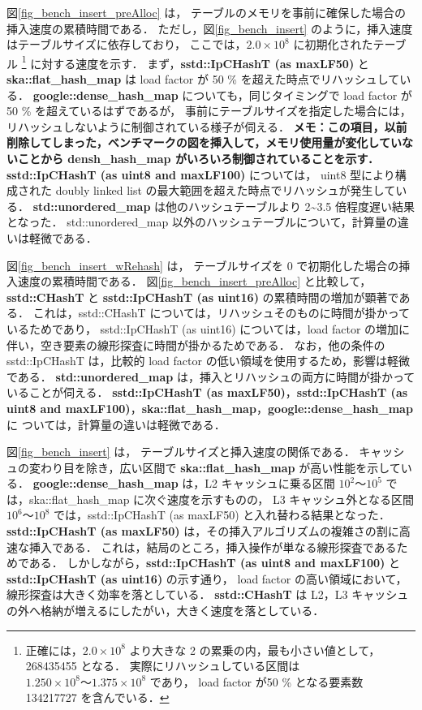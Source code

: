 図\ref{fig_bench_insert_preAlloc} は，
テーブルのメモリを事前に確保した場合の挿入速度の累積時間である．
ただし，図\ref{fig_bench_insert} のように，挿入速度はテーブルサイズに依存しており，
ここでは，$2.0\times10^8$ に初期化されたテーブル
\footnote{
  正確には，$2.0\times10^8$ より大きな 2 の累乗の内，最も小さい値として，268435455 となる．
  実際にリハッシュしている区間は $1.250\times10^8〜1.375\times10^8$ であり，
  load factor が50 \% となる要素数 134217727 を含んでいる．
}
に対する速度を示す．
まず，{\bf sstd::IpCHashT (as maxLF50)} と {\bf ska::flat\_hash\_map} は load factor が 50 \% を超えた時点でリハッシュしている．
{\bf google::dense\_hash\_map} についても，同じタイミングで load factor が 50 \% を超えているはずであるが，
事前にテーブルサイズを指定した場合には，リハッシュしないように制御されている様子が伺える．
{\bf \color{red}メモ：この項目，以前削除してしまった，ベンチマークの図を挿入して，メモリ使用量が変化していないことから densh\_hash\_map がいろいろ制御されていることを示す．}
{\bf sstd::IpCHashT (as uint8 and maxLF100)} については，
uint8 型により構成された doubly linked list の最大範囲を超えた時点でリハッシュが発生している．
{\bf std::unordered\_map} は他のハッシュテーブルより 2\textasciitilde 3.5 倍程度遅い結果となった．
std::unordered\_map 以外のハッシュテーブルについて，計算量の違いは軽微である．

図\ref{fig_bench_insert_wRehash} は，
テーブルサイズを 0 で初期化した場合の挿入速度の累積時間である．
図\ref{fig_bench_insert_preAlloc} と比較して，
{\bf sstd::CHashT} と {\bf sstd::IpCHashT (as uint16)} の累積時間の増加が顕著である．
これは，sstd::CHashT については，リハッシュそのものに時間が掛かっているためであり，
sstd::IpCHashT (as uint16) については，load factor の増加に伴い，空き要素の線形探査に時間が掛かるためである．
なお，他の条件の sstd::IpCHashT は，比較的 load factor の低い領域を使用するため，影響は軽微である．
{\bf std::unordered\_map} は，挿入とリハッシュの両方に時間が掛かっていることが伺える．
{\bf sstd::IpCHashT (as maxLF50)}，{\bf sstd::IpCHashT (as uint8 and maxLF100)}，{\bf ska::flat\_hash\_map}，{\bf google::dense\_hash\_map} に
ついては，計算量の違いは軽微である．

図\ref{fig_bench_insert} は，
テーブルサイズと挿入速度の関係である．
キャッシュの変わり目を除き，広い区間で {\bf ska::flat\_hash\_map} が高い性能を示している．
{\bf google::dense\_hash\_map} は，L2 キャッシュに乗る区間 $10^2〜 10^5$ では，ska::flat\_hash\_map に次ぐ速度を示すものの，
L3 キャッシュ外となる区間 $10^6〜 10^8$ では，sstd::IpCHashT (as maxLF50) と入れ替わる結果となった．
{\bf sstd::IpCHashT (as maxLF50)} は，その挿入アルゴリズムの複雑さの割に高速な挿入である．
これは，結局のところ，挿入操作が単なる線形探査であるためである．
しかしながら，{\bf sstd::IpCHashT (as uint8 and maxLF100)} と {\bf sstd::IpCHashT (as uint16)} の示す通り，
load factor の高い領域において，線形探査は大きく効率を落としている．
{\bf sstd::CHashT} は L2，L3 キャッシュの外へ格納が増えるにしたがい，大きく速度を落としている．
\leavevmode \newline

